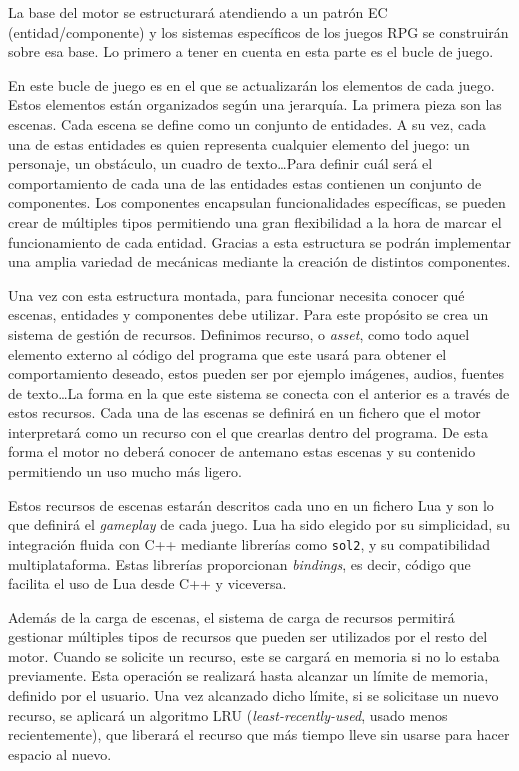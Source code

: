 \medskip  

La base del motor se estructurará atendiendo a un patrón EC (entidad/componente) y los sistemas específicos de los juegos RPG se construirán sobre esa base. Lo primero a tener en cuenta en esta parte es el bucle de juego.

\medskip  

En este bucle de juego es en el que se actualizarán los elementos de cada juego. Estos elementos están organizados según una jerarquía. La primera pieza son las escenas. Cada escena se define como un conjunto de entidades. A su vez, cada una de estas entidades es quien representa cualquier elemento del juego: un personaje, un obstáculo, un cuadro de texto\ldots Para definir cuál será el comportamiento de cada una de las entidades estas contienen un conjunto de componentes. Los componentes encapsulan funcionalidades específicas, se pueden crear de múltiples tipos permitiendo una gran flexibilidad a la hora de marcar el funcionamiento de cada entidad. Gracias a esta estructura se podrán implementar una amplia variedad de mecánicas mediante la creación de distintos componentes.  

\medskip

Una vez con esta estructura montada, para funcionar necesita conocer qué escenas, entidades y componentes debe utilizar. Para este propósito se crea un sistema de gestión de recursos. Definimos recurso, o \textit{asset}, como todo aquel elemento externo al código del programa que este usará para obtener el comportamiento deseado, estos pueden ser por ejemplo imágenes, audios, fuentes de texto\ldots La forma en la que este sistema se conecta con el anterior es a través de estos recursos. Cada una de las escenas se definirá en un fichero que el motor interpretará como un recurso con el que crearlas dentro del programa. De esta forma el motor no deberá conocer de antemano estas escenas y su contenido permitiendo un uso mucho más ligero.

\smallskip

Estos recursos de escenas estarán descritos cada uno en un fichero Lua y son lo que definirá el \textit{gameplay} de cada juego. Lua ha sido elegido por su simplicidad, su integración fluida con C++ mediante librerías como \texttt{sol2}, y su compatibilidad multiplataforma. Estas librerías proporcionan \textit{bindings}, es decir, código que facilita el uso de Lua desde C++ y viceversa.

\medskip

Además de la carga de escenas, el sistema de carga de recursos permitirá gestionar múltiples tipos de recursos que pueden ser utilizados por el resto del motor. Cuando se solicite un recurso, este se cargará en memoria si no lo estaba previamente. Esta operación se realizará hasta alcanzar un límite de memoria, definido por el usuario. Una vez alcanzado dicho límite, si se solicitase un nuevo recurso, se aplicará un algoritmo LRU (\textit{least-recently-used}, usado menos recientemente), que liberará el recurso que más tiempo lleve sin usarse para hacer espacio al nuevo.

